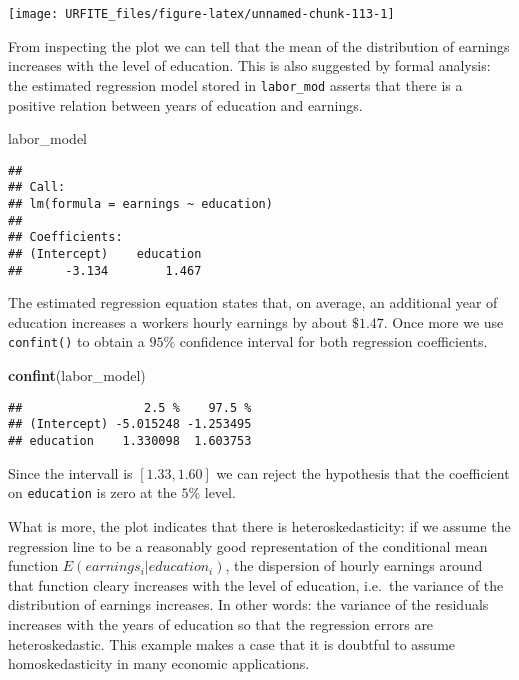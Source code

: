 \documentclass[]{book}
\newenvironment{Shaded}{\begin{snugshade}}{\end{snugshade}}
\newcommand{\KeywordTok}[1]{\textcolor[rgb]{0.13,0.29,0.53}{\textbf{#1}}}
\newcommand{\NormalTok}[1]{#1}
\theoremstyle{definition}
\theoremstyle{definition}
\theoremstyle{definition}
\theoremstyle{remark}
\begin{document}
\begin{center}\texttt{[image: URFITE\_files/figure-latex/unnamed-chunk-113-1]} \end{center}

From inspecting the plot we can tell that the mean of the distribution
of earnings increases with the level of education. This is also
suggested by formal analysis: the estimated regression model stored in
\texttt{labor\_mod} asserts that there is a positive relation between
years of education and earnings.

\begin{Shaded}
\begin{Highlighting}[]
\NormalTok{labor_model}
\end{Highlighting}
\end{Shaded}

\begin{verbatim}
## 
## Call:
## lm(formula = earnings ~ education)
## 
## Coefficients:
## (Intercept)    education  
##      -3.134        1.467
\end{verbatim}

The estimated regression equation states that, on average, an additional
year of education increases a workers hourly earnings by about
\(\$ 1.47\). Once more we use \texttt{confint()} to obtain a \(95\%\)
confidence interval for both regression coefficients.

\begin{Shaded}
\begin{Highlighting}[]
\KeywordTok{confint}\NormalTok{(labor_model)}
\end{Highlighting}
\end{Shaded}

\begin{verbatim}
##                 2.5 %    97.5 %
## (Intercept) -5.015248 -1.253495
## education    1.330098  1.603753
\end{verbatim}

Since the intervall is \([1.33, 1.60]\) we can reject the hypothesis
that the coefficient on \texttt{education} is zero at the \(5\%\) level.

What is more, the plot indicates that there is heteroskedasticity: if we
assume the regression line to be a reasonably good representation of the
conditional mean function \(E(earnings_i\vert education_i)\), the
dispersion of hourly earnings around that function cleary increases with
the level of education, i.e.~the variance of the distribution of
earnings increases. In other words: the variance of the residuals
increases with the years of education so that the regression errors are
heteroskedastic. This example makes a case that it is doubtful to assume
homoskedasticity in many economic applications.
\end{document}
